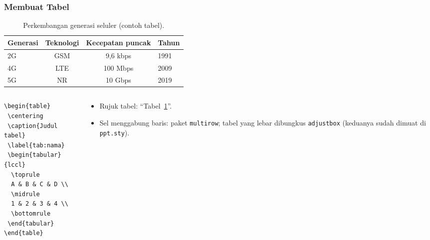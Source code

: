 \begin{frame}[fragile]
  \frametitle{Membuat Tabel}

  \begin{table}
    \centering
    \caption{Perkembangan generasi seluler (contoh tabel).}
    \label{tab:generasi}
    \small
    \begin{tabular}{lccl}
      \toprule
      Generasi & Teknologi & Kecepatan puncak & Tahun \\
      \midrule
      2G & GSM  & 9,6 kbps & 1991 \\
      4G & LTE  & 100 Mbps & 2009 \\
      5G & NR   & 10 Gbps  & 2019 \\
      \bottomrule
    \end{tabular}
  \end{table}

  \begin{columns}[T]
    \begin{column}{0.48\textwidth}
      \begin{lstlisting}[basicstyle=\ttfamily\tiny]
\begin{table}
 \centering
 \caption{Judul tabel}
 \label{tab:nama}
 \begin{tabular}{lccl}
  \toprule
  A & B & C & D \\
  \midrule
  1 & 2 & 3 & 4 \\
  \bottomrule
 \end{tabular}
\end{table}
      \end{lstlisting}
    \end{column}
    \hfill
    \begin{column}{0.48\textwidth}
      \begin{itemize}
        \item Rujuk tabel: ``Tabel~\ref{tab:generasi}''.
        \item Sel menggabung baris: paket \texttt{multirow}; tabel yang lebar
              dibungkus \texttt{adjustbox} (keduanya sudah dimuat di
              \texttt{ppt.sty}).
      \end{itemize}
    \end{column}
  \end{columns}
\end{frame}

